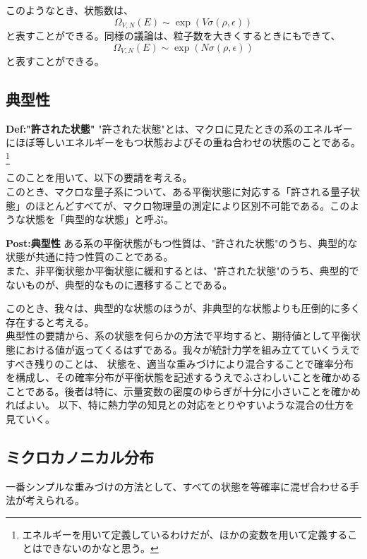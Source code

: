 \documentclass[a4paper,11pt]{jsarticle}
\numberwithin{equation}{section}
\begin{document}
このようなとき、状態数は、
\begin{equation}
  \Omega_{V,N}(E) \sim \exp(V\sigma(\rho, \epsilon))
\end{equation}
と表すことができる。同様の議論は、粒子数を大きくするときにもできて、
\begin{equation}
  \Omega_{V,N}(E) \sim \exp(N\sigma(\rho, \epsilon))
\end{equation}
と表すことができる。

\subsection{典型性}
\begin{itembox}[l]{\textbf{Def:"許された状態"}}
  "許された状態"とは、マクロに見たときの系のエネルギーにほぼ等しいエネルギーをもつ状態およびその重ね合わせの状態のことである。\footnote{エネルギーを用いて定義しているわけだが、ほかの変数を用いて定義することはできないのかなと思う。}
\end{itembox}
このことを用いて、以下の要請を考える。\\

このとき、マクロな量子系について、ある平衡状態に対応する「許される量子状態」のほとんどすべてが、マクロ物理量の測定により区別不可能である。このような状態を「典型的な状態」と呼ぶ。

\begin{itembox}[l]{\textbf{Post:典型性}}
  ある系の平衡状態がもつ性質は、"許された状態"のうち、典型的な状態が共通に持つ性質のことである。\\
  また、非平衡状態か平衡状態に緩和するとは、"許された状態"のうち、典型的でないものが、典型的なものに遷移することである。
\end{itembox}
このとき、我々は、典型的な状態のほうが、非典型的な状態よりも圧倒的に多く存在すると考える。\\

典型性の要請から、系の状態を何らかの方法で平均すると、期待値として平衡状態における値が返ってくるはずである。我々が統計力学を組み立てていくうえですべき残りのことは、
状態を、適当な重みづけにより混合することで確率分布を構成し、その確率分布が平衡状態を記述するうえでふさわしいことを確かめることである。後者は特に、示量変数の密度のゆらぎが十分に小さいことを確かめればよい。
以下、特に熱力学の知見との対応をとりやすいような混合の仕方を見ていく。\\

\subsection{ミクロカノニカル分布}
一番シンプルな重みづけの方法として、すべての状態を等確率に混ぜ合わせる手法が考えられる。
\end{document}
